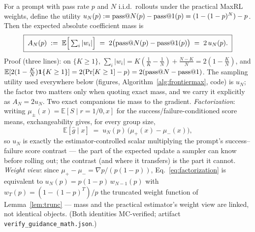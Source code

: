\begin{proposition}\label{prop:mass}
For a prompt with pass rate $p$ and $N$ i.i.d.\ rollouts under the
practical MaxRL weights, define the utility
$u_N(p) := \text{pass@}N(p) - \text{pass@}1(p) = (1-(1-p)^N) - p$. Then the
expected absolute coefficient mass is
\begin{equation}\boxed{\;
A_N(p) \;:=\; \mathbb{E}\Big[\textstyle\sum_i |w_i|\Big]
   \;=\; 2\big(\text{pass@}N(p) - \text{pass@}1(p)\big)
   \;=\; 2\,u_N(p).\;}
\label{eq:mass}
\end{equation}
Proof (three lines): on $\{K\ge 1\}$,
$\sum_i|w_i| = K(\tfrac1K - \tfrac1N) + \tfrac{N-K}{N} = 2(1-\tfrac KN)$,
and $\mathbb{E}[2(1-\tfrac KN)\mathbf 1\{K\ge1\}]
= 2(\Pr[K\ge1] - p) = 2(\text{pass@}N-\text{pass@}1)$. The sampling utility
used everywhere below (figures, Algorithm~\ref{alg:frontiermax}, code)
is $u_N$; the factor two matters only when quoting exact mass, and we
carry it explicitly as $A_N = 2u_N$. Two exact companions tie mass to
the gradient. \emph{Factorization}: writing $\mu_{\pm}(x) =
\mathbb{E}[S \mid r{=}1/0, x]$ for the success/failure-conditioned
score means, exchangeability gives, for every group size,
\begin{equation}
\mathbb{E}[\hat g \mid x] \;=\; u_N(p)\,\big(\mu_+(x) - \mu_-(x)\big),
\label{eq:factorization}
\end{equation}
so $u_N$ is exactly the estimator-controlled scalar multiplying the
prompt's success--failure score contrast --- the part of the expected
update a sampler can know before rolling out; the contrast (and where
it transfers) is the part it cannot. \emph{Weight view}: since
$\mu_+ - \mu_- = \nabla p/(p(1-p))$,
Eq.~\eqref{eq:factorization} is equivalent to
$u_N(p) = p(1-p)\,w_{N-1}(p)$ with $w_T(p) = (1-(1-p)^T)/p$ the
truncated weight function of Lemma~\ref{lem:trunc} --- mass and the
practical estimator's weight view are linked, not identical objects.
(Both identities MC-verified; artifact
\texttt{verify\_guidance\_math.json}.)
\end{proposition}
